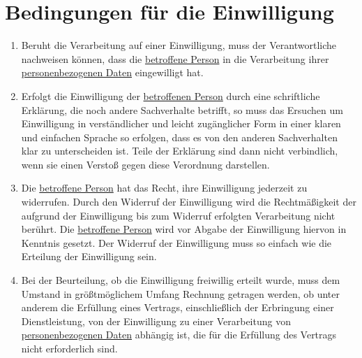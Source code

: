 \chapter{Bedingungen für die Einwilligung}
\label{ch:7}


\begin{enumerate}

  \item Beruht die Verarbeitung auf einer Einwilligung, muss der Verantwortliche nachweisen können, dass die \hyperref[itm:04-1]{betroffene
   Person} in die Verarbeitung ihrer \hyperref[itm:04-1]{personenbezogenen Daten} eingewilligt hat.
  \label{itm:07-1}

  \item Erfolgt die Einwilligung der \hyperref[itm:04-1]{betroffenen Person} durch eine schriftliche Erklärung, die noch andere Sachverhalte
   betrifft, so muss das Ersuchen um Einwilligung in verständlicher und leicht zugänglicher Form in einer klaren und
   einfachen Sprache so erfolgen, dass es von den anderen Sachverhalten klar zu unterscheiden ist. Teile der Erklärung
   sind dann nicht verbindlich, wenn sie einen Verstoß gegen diese Verordnung darstellen.
  \label{itm:07-2}

  \item Die \hyperref[itm:04-1]{betroffene Person} hat das Recht, ihre Einwilligung jederzeit zu widerrufen. Durch den Widerruf der
   Einwilligung wird die Rechtmäßigkeit der aufgrund der Einwilligung bis zum Widerruf erfolgten Verarbeitung nicht
   berührt. Die \hyperref[itm:04-1]{betroffene Person} wird vor Abgabe der Einwilligung hiervon in Kenntnis gesetzt. Der Widerruf der
   Einwilligung muss so einfach wie die Erteilung der Einwilligung sein.
  \label{itm:07-3}

  \item Bei der Beurteilung, ob die Einwilligung freiwillig erteilt wurde, muss dem Umstand in größtmöglichem Umfang
   Rechnung getragen werden, ob unter anderem die Erfüllung eines Vertrags, einschließlich der Erbringung einer
   Dienstleistung, von der Einwilligung zu einer Verarbeitung von \hyperref[itm:04-1]{personenbezogenen Daten} abhängig ist, die für die
   Erfüllung des Vertrags nicht erforderlich sind.
  \label{itm:07-4}

\end{enumerate}


